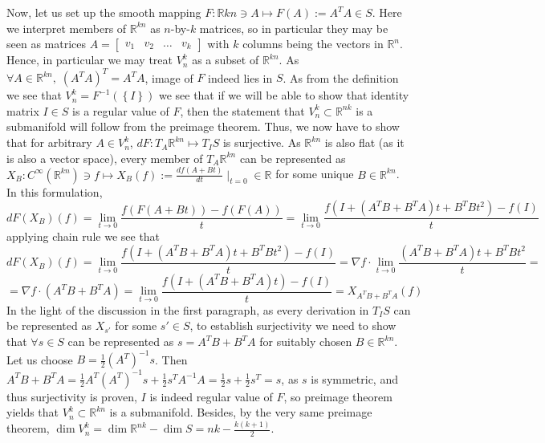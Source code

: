 \documentclass[8pt]{article} %
\begin{document}
\begin{enumerate}[label=\bfseries \arabic*.]
{		Now, let us set up the smooth mapping $F:\mathbb{R}{kn}\ni A\mapsto F(A):=A^TA\in S$. Here we interpret members of $\mathbb{R}^{kn}$ as $n$-by-$k$
		matrices, so in particular they may be seen as matrices $A=\begin{bmatrix}v_1&v_2&\dots&v_k\end{bmatrix}$ with $k$ columns being the vectors in 
		$\mathbb{R}^n$. Hence, in particular we may treat $V_n^k$ as a subset of $\mathbb{R}^{kn}$. As $\forall A\in\mathbb{R}^{kn},\;(A^TA)^T=A^TA$, image of
		$F$ indeed lies in $S$. As from the definition we see that $V_n^k=F^{-1}(\left\{I\right\})$ we see that if we will be able to show that identity matrix
		$I\in S$ is a regular value of $F$, then the statement that $V_n^k\subset\mathbb{R}^{nk}$ is a submanifold will follow from the preimage theorem.
		Thus, we now have to show that for arbitrary $A\in V_n^k$, $dF:T_A\mathbb{R}^{kn}\mapsto T_IS$ is surjective. As $\mathbb{R}^{kn}$ is also flat (as
		it is also a vector space), every member of $T_A\mathbb{R}^{kn}$ can be represented as $X_B:C^{\infty}(\mathbb{R}^{kn})\ni f\mapsto
		X_B(f):=\frac{df(A+Bt)}{dt}\mid_{t=0}\in\mathbb{R}$ for some unique $B\in\mathbb{R}^{kn}$. In this formulation,
		\[dF(X_B)(f)=\lim_{t\to 0}\frac{f(F(A+Bt))-f(F(A))}{t}=\lim_{t\to 0}\frac{f(I+(A^TB+B^TA)t+B^TBt^2)-f(I)}{t}\]applying chain rule we see that
		\[dF(X_B)(f)=\lim_{t\to 0}\frac{f(I+(A^TB+B^TA)t+B^TBt^2)-f(I)}{t}=\nabla f\cdot\lim_{t\to 0}\frac{(A^TB+B^TA)t+B^TBt^2}{t}=\]
		\[=\nabla f\cdot(A^TB+B^TA)=\lim_{t\to 0}\frac{f(I+(A^TB+B^TA)t)-f(I)}{t}=X_{A^TB+B^TA}(f)\]
		In the light of the discussion in the first paragraph, as every derivation in $T_I S$ can be represented as $X_{s'}$ for some $s'\in S$, to
		establish surjectivity we need to show that $\forall s\in S$ can be represented as $s=A^TB+B^TA$ for suitably chosen $B\in\mathbb{R}^{kn}$.
		Let us choose $B=\frac{1}{2}(A^T)^{-1}s$. Then $A^TB+B^TA=\frac{1}{2}A^T(A^T)^{-1}s+\frac{1}{2}s^TA^{-1}A=\frac{1}{2}s+\frac{1}{2}s^T=s$,
		as $s$ is symmetric, and thus
		surjectivity is proven, $I$ is indeed regular value of $F$, so preimage theorem yields that $V_n^k\subset\mathbb{R}^{kn}$ is a submanifold.
		Besides, by the very same preimage theorem, $\dim V_n^k=\dim \mathbb{R}^{nk}-\dim S=nk-\frac{k(k+1)}{2}$.

}
\end{enumerate}
\end{document}
